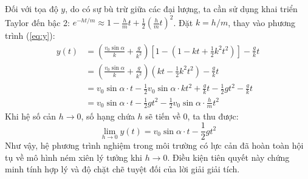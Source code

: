 Đối với tọa độ $y$, do có sự bù trừ giữa các đại lượng, ta cần sử dụng khai triển Taylor đến bậc 2: $e^{-ht/m} \approx 1 - \frac{h}{m}t + \frac{1}{2}\left(\frac{h}{m}t\right)^2$. Đặt $k = h/m$, thay vào phương trình (\ref{eq:y}):
\begin{align*}
y(t) &= \left(\frac{v_0\sin\alpha}{k} + \frac{g}{k^2}\right) \left[ 1 - \left(1 - kt + \frac{1}{2}k^2 t^2\right) \right] - \frac{g}{k}t \\
&= \left(\frac{v_0\sin\alpha}{k} + \frac{g}{k^2}\right) \left( kt - \frac{1}{2}k^2 t^2 \right) - \frac{g}{k}t \\
&= v_0\sin\alpha \cdot t - \frac{1}{2}v_0\sin\alpha \cdot k t^2 + \frac{g}{k}t - \frac{1}{2}gt^2 - \frac{g}{k}t \\
&= v_0\sin\alpha \cdot t - \frac{1}{2}gt^2 - \frac{1}{2}v_0\sin\alpha \cdot \frac{h}{m} t^2
\end{align*}
Khi hệ số cản $h \to 0$, số hạng chứa $h$ sẽ tiến về 0, ta thu được:
\begin{equation*}
\lim_{h \to 0} y(t) = v_0\sin\alpha \cdot t - \frac{1}{2}gt^2
\end{equation*}
Như vậy, hệ phương trình nghiệm trong môi trường có lực cản đã hoàn toàn hội tụ về mô hình ném xiên lý tưởng khi $h \to 0$. Điều kiện tiên quyết này chứng minh tính hợp lý và độ chặt chẽ tuyệt đối của lời giải giải tích.
